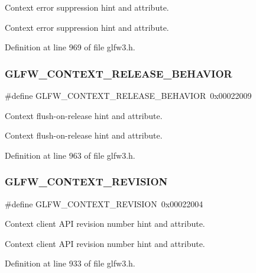 Context error suppression hint and attribute. 

Context error suppression hint and attribute. 

Definition at line 969 of file glfw3.\+h.

\mbox{\label{group__window_ga72b648a8378fe3310c7c7bbecc0f7be6}} 
\subsubsection{\texorpdfstring{GLFW\_CONTEXT\_RELEASE\_BEHAVIOR}{GLFW\_CONTEXT\_RELEASE\_BEHAVIOR}}
{\footnotesize\ttfamily \#define G\+L\+F\+W\+\_\+\+C\+O\+N\+T\+E\+X\+T\+\_\+\+R\+E\+L\+E\+A\+S\+E\+\_\+\+B\+E\+H\+A\+V\+I\+OR~0x00022009}



Context flush-\/on-\/release hint and attribute. 

Context flush-\/on-\/release hint and attribute. 

Definition at line 963 of file glfw3.\+h.

\mbox{\label{group__window_gafb9475071aa77c6fb05ca5a5c8678a08}} 
\subsubsection{\texorpdfstring{GLFW\_CONTEXT\_REVISION}{GLFW\_CONTEXT\_REVISION}}
{\footnotesize\ttfamily \#define G\+L\+F\+W\+\_\+\+C\+O\+N\+T\+E\+X\+T\+\_\+\+R\+E\+V\+I\+S\+I\+ON~0x00022004}



Context client A\+PI revision number hint and attribute. 

Context client A\+PI revision number hint and attribute. 

Definition at line 933 of file glfw3.\+h.

\mbox{\label{group__window_gade3593916b4c507900aa2d6844810e00}} 
